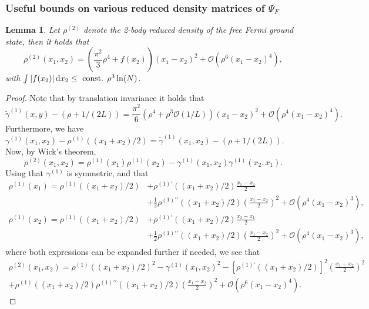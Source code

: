 \documentclass[a4paper,11pt]{article}
\newcommand{\abs}[1]{\left\lvert #1 \right\rvert}
\newcommand*\diff{\mathop{}\!\mathrm{d}}
\newtheorem{lemma}[theorem]{Lemma}
\numberwithin{equation}{section}
\begin{document}
	\subsubsection{Useful bounds on various reduced density matrices of $\Psi_F$}
	\begin{lemma}\label{Lemma rho2 bound}
	Let $\rho^{(2)}$ denote the 2-body reduced density of the free Fermi ground state, then it holds that
		\begin{equation}
		    \rho^{(2)}(x_1,x_2)=\left(\frac{\pi^2}{3}\rho^4+f(x_2)\right)(x_1-x_2)^2+\mathcal{O}(\rho^6(x_1-x_2)^4), 
		\end{equation} with $ \int \abs{f(x_2)}\diff x_2\leq \textnormal{ const. }\rho^3\ln(N) $.
	\end{lemma}
	\begin{proof}
		Note that by translation invariance it holds that $$ \tilde{\gamma}^{(1)}(x,y)-(\rho+1/(2L))=\frac{\pi^2}{6}(\rho^4+\rho^3\mathcal{O}(1/L))(x_1-x_2)^2+\mathcal{O}(\rho^4(x_1-x_2)^4). $$ Furthermore, we have $ \gamma^{(1)}(x_1,x_2)-\rho^{(1)}\left((x_1+x_2)/2\right)=\tilde{\gamma}^{(1)}(x_1,x_2)-(\rho+1/(2L)) $. Now, by Wick's theorem,  \begin{equation}
		\rho^{(2)}(x_1,x_2)=\rho^{(1)}(x_1)\rho^{(1)}(x_2)-\gamma^{(1)}(x_1,x_2)\gamma^{(1)}(x_2,x_1).
		\end{equation}
		Using that $ \gamma^{(1)} $ is symmetric, and that \begin{equation}
		\begin{aligned}
		\rho^{(1)}(x_1)=\rho^{(1)}((x_1+x_2)/2)&+\rho^{(1)\prime}((x_1+x_2)/2)\frac{x_1-x_2}{2}\\&+\frac{1}{2}\rho^{(1)\prime\prime}((x_1+x_2)/2)\left(\frac{x_1-x_2}{2}\right)^2+\mathcal{O}(\rho^4(x_1-x_2)^3),
		\end{aligned}
		\end{equation}
		\begin{equation}
		\begin{aligned}
		\rho^{(1)}(x_2)=\rho^{(1)}((x_1+x_2)/2)&+\rho^{(1)\prime}((x_1+x_2)/2)\frac{x_2-x_1}{2}\\&+\frac{1}{2}\rho^{(1)\prime\prime}((x_1+x_2)/2)\left(\frac{x_1-x_2}{2}\right)^2+\mathcal{O}(\rho^4(x_1-x_2)^3),
		\end{aligned}
		\end{equation}
		where both expressions can be expanded further if needed, we see that \begin{equation}
		\begin{aligned}
		\rho^{(2)}(x_1,x_2)=\rho^{(1)}((x_1+x_2)/2)^2-\gamma^{(1)}(x_1,x_2)^2-\left[\rho^{(1)\prime}((x_1+x_2)/2)\right]^2\left(\frac{x_1-x_2}{2}\right)^2\\+\rho^{(1)}((x_1+x_2)/2)\rho^{(1)\prime\prime}((x_1+x_2)/2)\left(\frac{x_1-x_2}{2}\right)^2+\mathcal{O}(\rho^6(x_1-x_2)^4).

\end{aligned}
\end{equation}
\end{proof}
\end{document}
